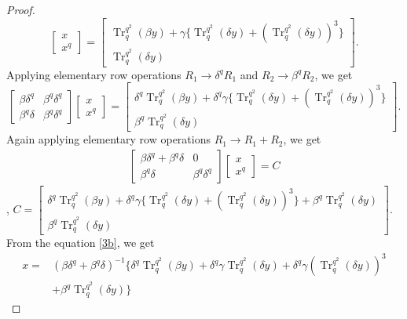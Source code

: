 \documentclass[10pt,a4paper]{amsart}
\begin{document}
\begin{proof}
$$\begin{bmatrix}
		x\\x^{q}
	\end{bmatrix}=
	\begin{bmatrix}
		\operatorname{Tr}_{q}^{q^2}(\beta y)+\gamma\{\operatorname{Tr}_{q}^{q^2}(\delta y)+(\operatorname{Tr}_{q}^{q^2}(\delta y))^3\}\\
		\operatorname{Tr}_{q}^{q^2}(\delta y)
	\end{bmatrix}.$$
	Applying elementary row operations $R_1\rightarrow\delta^{q}R_1$ and $R_2\rightarrow\beta^{q}R_2$, we get
	$$\begin{bmatrix}
		\beta\delta^{q}&\beta^{q}\delta^{q}\\
		\beta^{q}\delta&\beta^{q}\delta^{q}
	\end{bmatrix}
	\begin{bmatrix}
		x\\x^{q}
	\end{bmatrix}=
	\begin{bmatrix}
		\delta^{q}\operatorname{Tr}_{q}^{q^2}(\beta y)+\delta^{q}\gamma\{\operatorname{Tr}_{q}^{q^2}(\delta y)+(\operatorname{Tr}_{q}^{q^2}(\delta y))^3\}\\
		\beta^{q}\operatorname{Tr}_{q}^{q^2}(\delta y)
	\end{bmatrix}.$$
	Again applying elementary row operations $R_1\rightarrow R_1+R_2$, we get
	\begin{align}\begin{bmatrix}
		\beta\delta^{q}+\beta^{q}\delta&0\\
		\beta^{q}\delta&\beta^{q}\delta^{q}
	\end{bmatrix}
	\begin{bmatrix}
		x\\x^{q}
	\end{bmatrix}=C\label{3b}\end{align}
	, $C=
	\begin{bmatrix}
		\delta^{q}\operatorname{Tr}_{q}^{q^2}(\beta y)+\delta^{q}\gamma\{\operatorname{Tr}_{q}^{q^2}(\delta y)+(\operatorname{Tr}_{q}^{q^2}(\delta y))^3\}+\beta^{q}\operatorname{Tr}_{q}^{q^2}(\delta y)\\
		\beta^{q}\operatorname{Tr}_{q}^{q^2}(\delta y)
	\end{bmatrix}.$\\
		From the equation \ref{3b}, we get
		\begin{align*}
	x=&(\beta\delta^{q}+\beta^{q}\delta)^{-1}\{\delta^{q}\operatorname{Tr}_{q}^{q^2}(\beta y)+\delta^{q}\gamma\operatorname{Tr}_{q}^{q^2}(\delta y)+\delta^{q}\gamma(\operatorname{Tr}_{q}^{q^2}(\delta y))^3\\&+\beta^{q}\operatorname{Tr}_{q}^{q^2}(\delta y)\}

\end{align*}
\end{proof}
\end{document}
